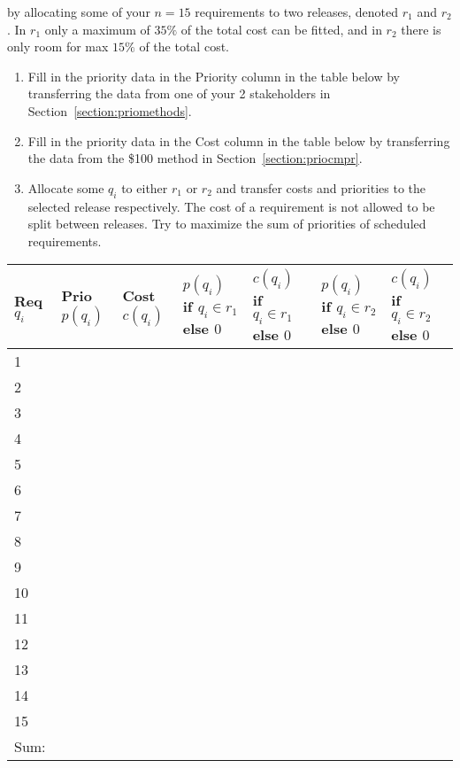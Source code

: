 \documentclass[11pt]{article}
\begin{document}
\begin{framed}
\footnotesize
{} by allocating some of your $n=15$ requirements to two releases, denoted $r_1$ and $r_2$. In $r_1$ only a maximum of $35\%$ of the total cost can be fitted, and in $r_2$ there is only room for max $15\%$ of the total cost.

 \begin{enumerate}[noitemsep]
\item Fill in the priority data in the Priority column in the table below by transferring the data from one of your 2 stakeholders in Section~\ref{section:priomethods}.
\item   Fill in the priority data in the Cost column in the table below by transferring the data from the \$100 method in Section~\ref{section:priocmpr}.
\item Allocate some $q_i$ to either $r_1$ or $r_2$ and transfer costs and priorities to the selected release respectively. The cost of a requirement is not allowed to be split between releases. Try to maximize the sum of priorities of scheduled requirements. 
\end{enumerate}
\begin{tabular}{| p{8mm} | p{12mm} | p{12mm} | p{1.4cm} | p{1.4cm} | p{1.4cm} |  p{1.4cm} |}
\hline
Req $q_i$ &  
Prio $p(q_i)$ & 
Cost $c(q_i)$ & 
$p(q_i)$ if $q_i \in r_1$ else $0$ &
$c(q_i)$ if $q_i \in r_1$ else $0$ &
$p(q_i)$ if $q_i \in r_2$ else $0$ & 
$c(q_i)$ if $q_i \in r_2$ else $0$  \\
\hline
\hline 1 & & & & & &\\ 
\hline 2 & & & & & &\\
\hline 3 & & & & & &\\
\hline 4 & & & & & &\\
\hline 5 & & & & & &\\
\hline 6 & & & & & &\\
\hline 7 & & & & & &\\
\hline 8 & & & & & &\\
\hline 9 & & & & & &\\
\hline 10 & & &  &  & &\\ 
\hline 11 & & & &  & &\\
\hline 12 & & & &  & &\\
\hline 13 & & & &  & &\\
\hline 14 & & & &  & &\\
\hline 15 & & & &  & &\\
\hline
\hline Sum:   &  & &  & &  & \\

\end{tabular}
\end{framed}
\end{document}
